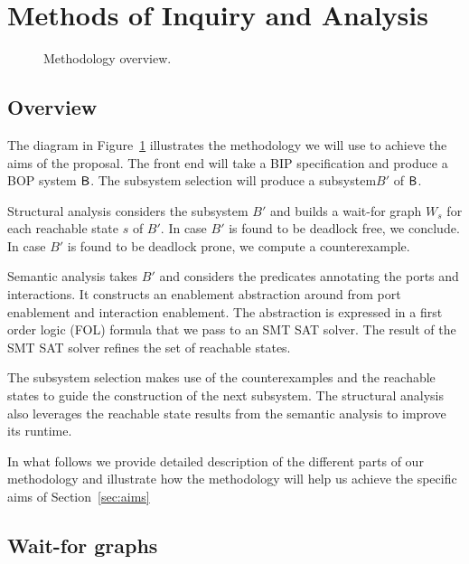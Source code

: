 \section{Methods of Inquiry and Analysis}

\begin{figure}[t]
  \begin{center}

    \resizebox{\textwidth}{!}{
     
   }
    \caption{Methodology overview.}
    \label{fig:overview}
  \end{center}
\end{figure}

\subsection{Overview} 

The diagram in Figure~\ref{fig:overview} illustrates the 
methodology we will use to achieve the aims of the proposal. 
The front end will take a BIP specification and produce
a BOP system $\mathsf{B}$. 
The subsystem selection will produce a subsystem$B'$ of $\mathsf{B}$. 

Structural analysis considers the subsystem $B'$ and builds
a wait-for graph $W_s$ for each reachable state $s$ of $B'$. 
In case $B'$ is found to be deadlock free, we conclude. 
In case $B'$ is found to be deadlock prone, we compute 
a counterexample. 

Semantic analysis takes $B'$ and considers the predicates
annotating the ports and interactions. 
It constructs an enablement abstraction around from 
port enablement and interaction enablement. 
The abstraction is expressed in a first order logic (FOL)
formula that we pass to an SMT SAT solver. 
The result of the SMT SAT solver refines the set of reachable 
states. 

The subsystem selection makes use of the counterexamples 
and the reachable states to
guide the construction of the next subsystem. 
The structural analysis also leverages the reachable state
results from the semantic analysis to improve its runtime. 

In what follows we provide detailed description of the 
different parts of our methodology and illustrate how 
the methodology will help us achieve the specific aims
of Section~\ref{sec:aims}

\subsection{Wait-for graphs}

